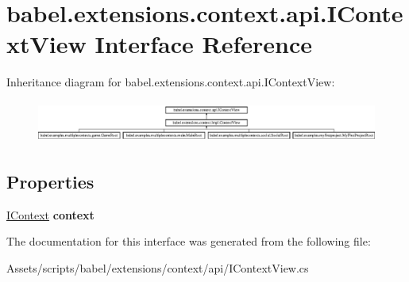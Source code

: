 \hypertarget{interfacebabel_1_1extensions_1_1context_1_1api_1_1_i_context_view}{\section{babel.\-extensions.\-context.\-api.\-I\-Context\-View Interface Reference}
\label{interfacebabel_1_1extensions_1_1context_1_1api_1_1_i_context_view}
}
Inheritance diagram for babel.\-extensions.\-context.\-api.\-I\-Context\-View\-:\begin{figure}[H]
\begin{center}
\leavevmode
\includegraphics[height=1.400000cm]{interfacebabel_1_1extensions_1_1context_1_1api_1_1_i_context_view}
\end{center}
\end{figure}
\subsection*{Properties}
\begin{DoxyCompactItemize}
\item 
\hypertarget{interfacebabel_1_1extensions_1_1context_1_1api_1_1_i_context_view_a6145e964d20dacbccbd395201c89ffa5}{\hyperlink{interfacebabel_1_1extensions_1_1context_1_1api_1_1_i_context}{I\-Context} {\bfseries context}}\label{interfacebabel_1_1extensions_1_1context_1_1api_1_1_i_context_view_a6145e964d20dacbccbd395201c89ffa5}

\end{DoxyCompactItemize}


The documentation for this interface was generated from the following file\-:\begin{DoxyCompactItemize}
\item 
Assets/scripts/babel/extensions/context/api/I\-Context\-View.\-cs\end{DoxyCompactItemize}
